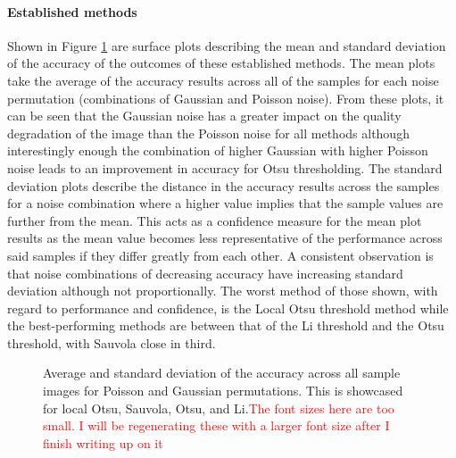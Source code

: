 \paragraph{Established methods} Shown in Figure \ref{fig:accuracy_thresh_surface} are surface plots describing the mean and standard deviation of the accuracy of the outcomes of these established methods. The mean plots take the average of the accuracy results across all of the samples for each noise permutation (combinations of Gaussian and Poisson noise). From these plots, it can be seen that the Gaussian noise has a greater impact on the quality degradation of the image than the Poisson noise for all methods although interestingly enough the combination of higher Gaussian with higher Poisson noise leads to an improvement in accuracy for Otsu thresholding. The standard deviation plots describe the distance in the accuracy results across the samples for a noise combination where a higher value implies that the sample values are further from the mean. This acts as a confidence measure for the mean plot results as the mean value becomes less representative of the performance across said samples if they differ greatly from each other. A consistent observation is that noise combinations of decreasing accuracy have increasing standard deviation although not proportionally. The worst method of those shown, with regard to performance and confidence, is the Local Otsu threshold method while the best-performing methods are between that of the Li threshold and the Otsu threshold, with Sauvola close in third.
\begin{figure}[h!]
    \centering
    \caption[Average and standard deviation of the accuracy across all sample images for Poisson and Gaussian permutations]{Average and standard deviation of the accuracy across all sample images for Poisson and Gaussian permutations. This is showcased for local Otsu, Sauvola, Otsu, and Li.\textcolor{red}{The font sizes here are too small. I will be regenerating these with a larger font size after I finish writing up on it}}
    \label{fig:accuracy_thresh_surface}
\end{figure}
